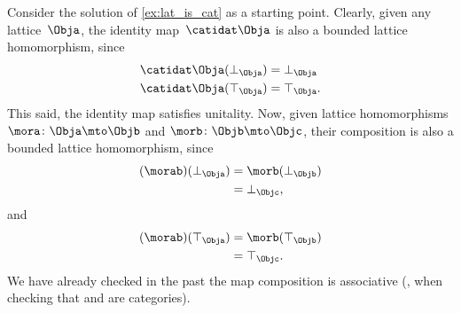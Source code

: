 \begin{solution}
    Consider the solution of \cref{ex:lat_is_cat} as a starting point.
    Clearly, given any lattice~$\Obja$, the identity map~$\catidat\Obja$ is also a bounded lattice homomorphism, since
    \begin{equation}
        \begin{aligned}
            \catidat\Obja(\bot_\Obja) & =\bot_\Obja \\
            \catidat\Obja(\top_\Obja) & =\top_\Obja.
        \end{aligned}
    \end{equation}
    This said, the identity map satisfies unitality.
    Now, given lattice homomorphisms $\mora\colon \Obja \mto \Objb$ and  $\morb\colon \Objb\mto \Objc$, their composition is also a bounded lattice homomorphism, since
    \begin{equation}
        \begin{aligned}
            (\morab)(\bot_\Obja)
             & = \morb(\bot_\Objb) \\
             & = \bot_\Objc,
        \end{aligned}
    \end{equation}
    and
    \begin{equation}
        \begin{aligned}
            (\morab)(\top_\Obja)
             & = \morb(\top_\Objb) \\
             & = \top_\Objc.
        \end{aligned}
    \end{equation}
    We have already checked in the past the map composition is associative (\eg, when checking that \Set and \Pos are categories).
\end{solution}
